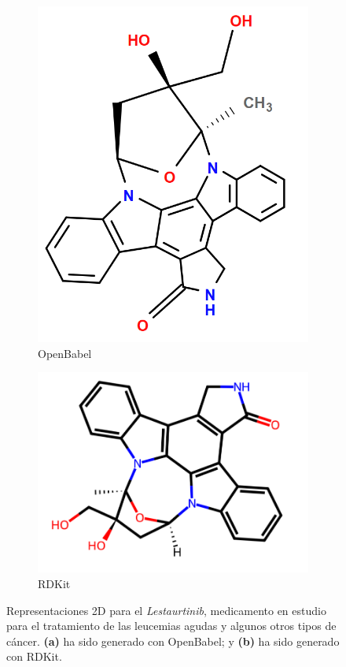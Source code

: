 \begin{figure}[h!]
\centering
\begin{subfigure}{.5\textwidth}
  \centering
  \includegraphics[width=.7\linewidth]{imagenes/estado_arte/Lestaurtinib_openbabel.png}
  \caption{OpenBabel}
  \label{fig:sub1}
\end{subfigure}%
\begin{subfigure}{.5\textwidth}
  \centering
  \includegraphics[width=.9\linewidth]{imagenes/estado_arte/Lestaurtinib_rdkit.png}
  \caption{RDKit}
  \label{fig:sub2}
\end{subfigure}
\caption{Representaciones 2D para el \emph{Lestaurtinib}, medicamento en estudio para el tratamiento de las leucemias agudas y algunos otros tipos de cáncer. \textbf{(a)} ha sido generado con OpenBabel; y \textbf{(b)} ha sido generado con RDKit.}
\label{fig:ejemplo_rdkit_vs_babel}
\end{figure}



